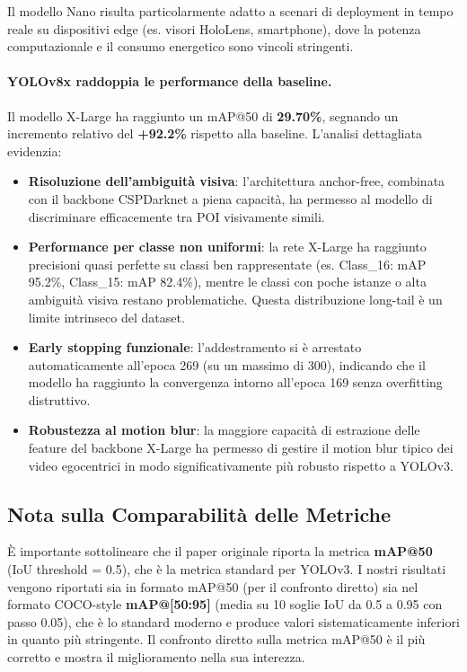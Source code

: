 \documentclass[a4paper,12pt]{report}
\begin{document}
Il modello Nano risulta particolarmente adatto a scenari di deployment in tempo reale su dispositivi edge (es. visori HoloLens, smartphone), dove la potenza computazionale e il consumo energetico sono vincoli stringenti.

\paragraph{YOLOv8x raddoppia le performance della baseline.}
Il modello X-Large ha raggiunto un mAP@50 di \textbf{29.70\%}, segnando un incremento relativo del \textbf{+92.2\%} rispetto alla baseline. L'analisi dettagliata evidenzia:

\begin{itemize}
    \item \textbf{Risoluzione dell'ambiguità visiva}: l'architettura anchor-free, combinata con il backbone CSPDarknet a piena capacità, ha permesso al modello di discriminare efficacemente tra POI visivamente simili.
    
    \item \textbf{Performance per classe non uniformi}: la rete X-Large ha raggiunto precisioni quasi perfette su classi ben rappresentate (es. Class\_16: mAP 95.2\%, Class\_15: mAP 82.4\%), mentre le classi con poche istanze o alta ambiguità visiva restano problematiche. Questa distribuzione long-tail è un limite intrinseco del dataset.
    
    \item \textbf{Early stopping funzionale}: l'addestramento si è arrestato automaticamente all'epoca 269 (su un massimo di 300), indicando che il modello ha raggiunto la convergenza intorno all'epoca 169 senza overfitting distruttivo.
    
    \item \textbf{Robustezza al motion blur}: la maggiore capacità di estrazione delle feature del backbone X-Large ha permesso di gestire il motion blur tipico dei video egocentrici in modo significativamente più robusto rispetto a YOLOv3.
\end{itemize}

\subsection{Nota sulla Comparabilità delle Metriche}

È importante sottolineare che il paper originale riporta la metrica \textbf{mAP@50} (IoU threshold = 0.5), che è la metrica standard per YOLOv3. I nostri risultati vengono riportati sia in formato mAP@50 (per il confronto diretto) sia nel formato COCO-style \textbf{mAP@[50:95]} (media su 10 soglie IoU da 0.5 a 0.95 con passo 0.05), che è lo standard moderno e produce valori sistematicamente inferiori in quanto più stringente. Il confronto diretto sulla metrica mAP@50 è il più corretto e mostra il miglioramento nella sua interezza.
\end{document}
